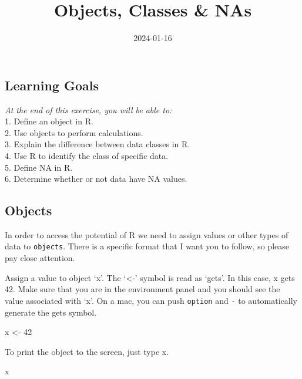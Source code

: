 \documentclass[
]{article}
\title{Objects, Classes \& NAs}
\author{}
\date{\vspace{-2.5em}2024-01-16}
\newenvironment{Shaded}{\begin{snugshade}}{\end{snugshade}}
\newcommand{\DecValTok}[1]{\textcolor[rgb]{0.00,0.00,0.81}{#1}}
\newcommand{\NormalTok}[1]{#1}
\newcommand{\OtherTok}[1]{\textcolor[rgb]{0.56,0.35,0.01}{#1}}
\begin{document}
\maketitle

{
\setcounter{tocdepth}{2}
\tableofcontents
}
\hypertarget{learning-goals}{%
\subsection{Learning Goals}\label{learning-goals}}

\emph{At the end of this exercise, you will be able to:}\\
1. Define an object in R.\\
2. Use objects to perform calculations.\\
3. Explain the difference between data classes in R.\\
4. Use R to identify the class of specific data.\\
5. Define NA in R.\\
6. Determine whether or not data have NA values.

\hypertarget{objects}{%
\subsection{Objects}\label{objects}}

In order to access the potential of R we need to assign values or other
types of data to \texttt{objects}. There is a specific format that I
want you to follow, so please pay close attention.

Assign a value to object `x'. The `\textless-' symbol is read as `gets'.
In this case, x gets 42. Make sure that you are in the environment panel
and you should see the value associated with `x'. On a mac, you can push
\texttt{option} and \texttt{-} to automatically generate the gets
symbol.

\begin{Shaded}
\begin{Highlighting}[]
\NormalTok{x }\OtherTok{\textless{}{-}} \DecValTok{42}
\end{Highlighting}
\end{Shaded}

To print the object to the screen, just type x.

\begin{Shaded}
\begin{Highlighting}[]
\NormalTok{x}
\end{Highlighting}
\end{Shaded}
\end{document}
